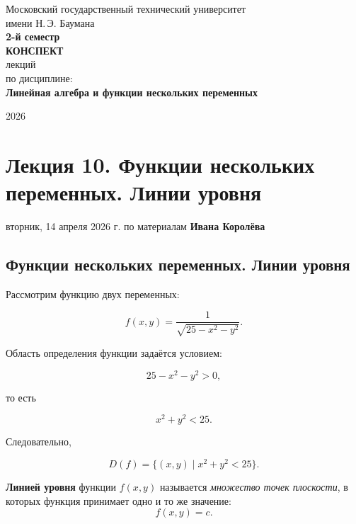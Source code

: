 \documentclass[a4paper,12pt]{article}
\begin{document}

\begin{titlepage}
    \begin{center}
        \large Московский государственный технический университет\\
        имени Н.\,Э. Баумана\\[1cm]

        \textbf{2-й семестр}\\[5cm]

        {\LARGE \textbf{КОНСПЕКТ}}\\[0.5cm]
        {\Large лекций}\\[2cm]

        {\large по дисциплине:}\\[0.3cm]
        {\Large \textbf{Линейная алгебра и функции нескольких переменных}}\\[3cm]
    \end{center}

    \vfill

    \begin{center}
        2026
    \end{center}
\end{titlepage}

\clearpage
{}

\tableofcontents
\newpage
\section{Лекция 10. Функции нескольких переменных. Линии уровня}

вторник, 14 апреля 2026 г. по материалам \textbf{Ивана Королёва}

\subsection*{Функции нескольких переменных. Линии уровня}

Рассмотрим функцию двух переменных:

\[
f(x,y)
=
\frac{1}{\sqrt{25-x^2-y^2}}.
\]

Область определения функции задаётся условием:

\[
25-x^2-y^2>0,
\]

то есть

\[
x^2+y^2<25.
\]

Следовательно,

\[
D(f)=\{(x,y)\mid x^2+y^2<25\}.
\]

\begin{definitionbox}
\textbf{Линией уровня} функции $f(x,y)$ называется \textit{множество точек плоскости}, в которых функция принимает одно и то же значение:
\[
f(x,y)=c.
\]
\end{definitionbox}
\end{document}
